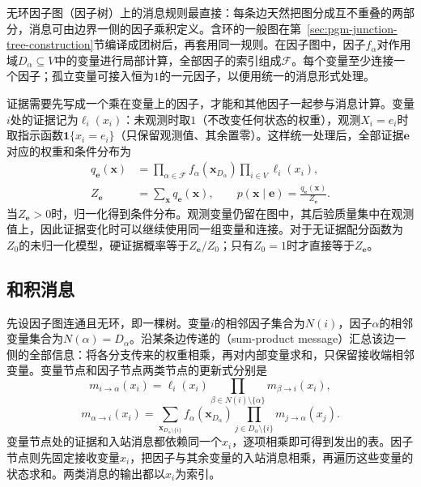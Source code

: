 无环因子图（因子树）上的消息规则最直接：每条边天然把图分成互不重叠的两部分，消息可由边界一侧的因子乘积定义。含环的一般图在第~\ref{sec:pgm-junction-tree-construction}节编译成团树后，再套用同一规则。在因子图中，因子$f_\alpha$对作用域$D_\alpha\subseteq V$中的变量进行局部计算，全部因子的索引组成$\mathcal{F}$。每个变量至少连接一个因子；孤立变量可接入恒为$1$的一元因子，以便用统一的消息形式处理。

证据需要先写成一个乘在变量上的因子，才能和其他因子一起参与消息计算。变量$i$处的证据记为$\ell_i(x_i)$：未观测时取$1$（不改变任何状态的权重），观测$X_i=e_i$时取指示函数$\mathbf{1}\{x_i=e_i\}$（只保留观测值、其余置零）。这样统一处理后，全部证据$\bm e$对应的权重和条件分布为
\begin{equation}
  \begin{aligned}
    q_{\bm{e}}(\bm{x})
      &=\prod_{\alpha\in\mathcal{F}}f_\alpha(\bm{x}_{D_\alpha})
        \prod_{i\in V}\ell_i(x_i),\\
    Z_{\bm{e}}&=\sum_{\bm{x}}q_{\bm{e}}(\bm{x}),\qquad
    p(\bm{x}\mid\bm{e})=\frac{q_{\bm{e}}(\bm{x})}{Z_{\bm{e}}}.
  \end{aligned}
  \label{eq:pgm-junction-tree-evidence-weight}
\end{equation}
当$Z_{\bm e}>0$时，归一化得到条件分布。观测变量仍留在图中，其后验质量集中在观测值上，因此证据变化时可以继续使用同一组变量和连接。对于无证据配分函数为$Z_0$的未归一化模型，硬证据概率等于$Z_{\bm e}/Z_0$；只有$Z_0=1$时才直接等于$Z_{\bm e}$。

\subsection{和积消息}
\label{sec:pgm-junction-tree-sum-product}

先设因子图连通且无环，即一棵树。变量$i$的相邻因子集合为$N(i)$，因子$\alpha$的相邻变量集合为$N(\alpha)=D_\alpha$。沿某条边传递的（sum-product message）汇总该边一侧的全部信息：将各分支传来的权重相乘，再对内部变量求和，只保留接收端相邻变量。变量节点和因子节点两类节点的更新式分别是
\begin{equation}
  m_{i\to\alpha}(x_i)
    =\ell_i(x_i)
      \prod_{\beta\in N(i)\setminus\{\alpha\}}
      m_{\beta\to i}(x_i),
  \label{eq:pgm-junction-tree-variable-message}
\end{equation}
\begin{equation}
  m_{\alpha\to i}(x_i)
    =\sum_{\bm{x}_{D_\alpha\setminus\{i\}}}
      f_\alpha(\bm{x}_{D_\alpha})
      \prod_{j\in D_\alpha\setminus\{i\}}
      m_{j\to\alpha}(x_j).
  \label{eq:pgm-junction-tree-factor-message}
\end{equation}
变量节点处的证据和入站消息都依赖同一个$x_i$，逐项相乘即可得到发出的表。因子节点则先固定接收变量$x_i$，把因子与其余变量的入站消息相乘，再遍历这些变量的状态求和。两类消息的输出都以$x_i$为索引。


